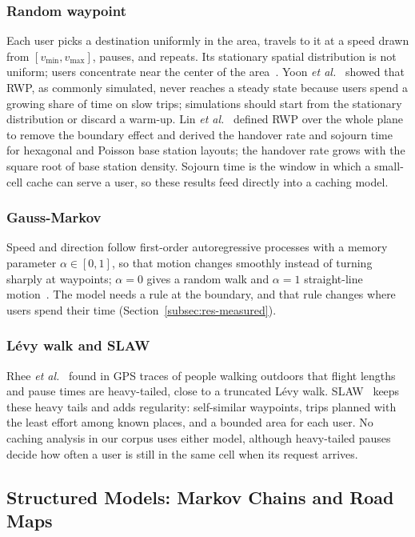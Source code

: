 \subsubsection{Random waypoint}
Each user picks a destination uniformly in the area, travels to it at a speed drawn from $[v_{\min},v_{\max}]$, pauses, and repeats. Its stationary spatial distribution is not uniform; users concentrate near the center of the area~\cite{bettstetter2004rwp}. Yoon \emph{et al.}~\cite{yoon2003rwp} showed that RWP, as commonly simulated, never reaches a steady state because users spend a growing share of time on slow trips; simulations should start from the stationary distribution or discard a warm-up. Lin \emph{et al.}~\cite{lin2013mobility} defined RWP over the whole plane to remove the boundary effect and derived the handover rate and sojourn time for hexagonal and Poisson base station layouts; the handover rate grows with the square root of base station density. Sojourn time is the window in which a small-cell cache can serve a user, so these results feed directly into a caching model.

\subsubsection{Gauss-Markov}
Speed and direction follow first-order autoregressive processes with a memory parameter $\alpha\in[0,1]$, so that motion changes smoothly instead of turning sharply at waypoints; $\alpha=0$ gives a random walk and $\alpha=1$ straight-line motion~\cite{camp2002survey}. The model needs a rule at the boundary, and that rule changes where users spend their time (Section~\ref{subsec:res-measured}).

\subsubsection{L\'evy walk and SLAW}
Rhee \emph{et al.}~\cite{rhee2011levy} found in GPS traces of people walking outdoors that flight lengths and pause times are heavy-tailed, close to a truncated L\'evy walk. SLAW~\cite{lee2009slaw} keeps these heavy tails and adds regularity: self-similar waypoints, trips planned with the least effort among known places, and a bounded area for each user. No caching analysis in our corpus uses either model, although heavy-tailed pauses decide how often a user is still in the same cell when its request arrives.

\subsection{Structured Models: Markov Chains and Road Maps}
\label{subsec:structured}

